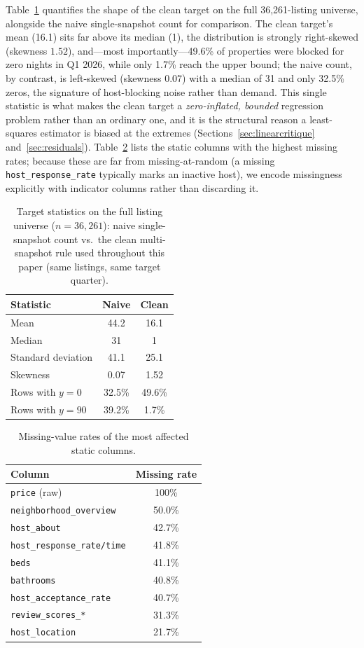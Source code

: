 \documentclass[journal]{IEEEtran}
\begin{document}
Table~\ref{tab:targetstats} quantifies the shape of the clean target on the
full 36{,}261-listing universe, alongside the naive single-snapshot count for
comparison. The clean target's mean (16.1) sits far above its median (1), the
distribution is strongly right-skewed (skewness $1.52$), and---most
importantly---49.6\% of properties were blocked for zero nights in Q1 2026,
while only 1.7\% reach the upper bound; the naive count, by contrast, is
left-skewed (skewness $0.07$) with a median of 31 and only 32.5\% zeros, the
signature of host-blocking noise rather than demand. This single statistic is
what makes the clean target a \emph{zero-inflated, bounded} regression problem
rather than an ordinary one, and it is the structural reason a least-squares
estimator is biased at the extremes (Sections~\ref{sec:linearcritique}
and~\ref{sec:residuals}). Table~\ref{tab:missing} lists the static columns with
the highest missing rates; because these are far from missing-at-random (a
missing \texttt{host\_response\_rate} typically marks an inactive host), we
encode missingness explicitly with indicator columns rather than discarding it.

\begin{table}[!t]
\caption{Target statistics on the full listing universe ($n=36{,}261$): naive
single-snapshot count vs.\ the clean multi-snapshot rule used throughout this
paper (same listings, same target quarter).}
\label{tab:targetstats}
\centering
\begin{tabular}{lcc}
\toprule
Statistic & Naive & Clean \\
\midrule
Mean & 44.2 & 16.1 \\
Median & 31 & 1 \\
Standard deviation & 41.1 & 25.1 \\
Skewness & 0.07 & 1.52 \\
Rows with $y=0$ & 32.5\% & 49.6\% \\
Rows with $y=90$ & 39.2\% & 1.7\% \\
\bottomrule
\end{tabular}
\end{table}

\begin{table}[!t]
\caption{Missing-value rates of the most affected static columns.}
\label{tab:missing}
\centering
\begin{tabular}{lc}
\toprule
Column & Missing rate \\
\midrule
\texttt{price} (raw) & 100\% \\
\texttt{neighborhood\_overview} & 50.0\% \\
\texttt{host\_about} & 42.7\% \\
\texttt{host\_response\_rate/time} & 41.8\% \\
\texttt{beds} & 41.1\% \\
\texttt{bathrooms} & 40.8\% \\
\texttt{host\_acceptance\_rate} & 40.7\% \\
\texttt{review\_scores\_*} & 31.3\% \\
\texttt{host\_location} & 21.7\% \\
\bottomrule
\end{tabular}
\end{table}
\end{document}
